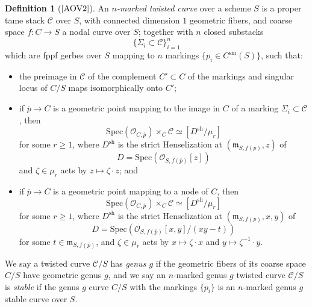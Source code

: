\documentclass[11pt]{amsart}
\theoremstyle{definition}
\newtheorem{definition}[subsection]{Definition}
\begin{document}
\begin{definition}[$\textrm{\cite[\S2]{AOV2}}$]\label{twistedcurvedef}
An \textit{$n$-marked twisted curve} over a scheme $S$ is a proper tame stack ${\mathcal{C}}$ over $S$, with connected dimension $1$ geometric fibers, and coarse space $f:C \rightarrow S$ a nodal curve over $S$; together with $n$ closed substacks 
\begin{displaymath}
\{\Sigma_i \subset {\mathcal{C}}\}_{i = 1}^n 
\end{displaymath}
which are fppf gerbes over $S$ mapping to $n$ markings $\{p_i \in C^{\mathrm{sm}}(S)\}$, such that:
\begin{itemize}
  \item the preimage in ${\mathcal{C}}$ of the complement $C' \subset C$ of the markings and singular locus of $C/S$ maps isomorphically onto $C'$; 
  \item if $\overline{p} \rightarrow C$ is a geometric point mapping to the image in $C$ of a marking $\Sigma_i \subset {\mathcal{C}}$, then 
  \begin{displaymath}
  \mathrm{Spec}({\mathcal{O}}_{C,\overline{p}}) \times_C {\mathcal{C}} \simeq [D^{\mathrm{sh}}/\mu_r]
  \end{displaymath}
  for some $r\geq1$, where $D^{\mathrm{sh}}$ is the strict Henselization at $({\mathfrak{m}}_{S,f(\overline{p})},z)$ of 
  \begin{displaymath}
  D = \mathrm{Spec}({\mathcal{O}}_{S,f(\overline{p})}[z]) 
  \end{displaymath}
  and $\zeta\in \mu_r$ acts by $z\mapsto \zeta\cdot z$; and 
  \item if $\overline{p} \rightarrow C$ is a geometric point mapping to a node of $C$, then
  \begin{displaymath}
  \mathrm{Spec}({\mathcal{O}}_{C,\overline{p}})\times_C {\mathcal{C}} \simeq [D^{\mathrm{sh}}/\mu_r]
  \end{displaymath}
  for some $r\geq 1$, where $D^{\mathrm{sh}}$ is the strict Henselization at $({\mathfrak{m}}_{S,f(\overline{p})},x,y)$ of 
  \begin{displaymath}
  D = \mathrm{Spec}({\mathcal{O}}_{S,f(\overline{p})}[x,y]/(xy-t))
  \end{displaymath}
  for some $t \in {\mathfrak{m}}_{S,f(\overline{p})}$, and $\zeta\in \mu_r$ acts by $x \mapsto \zeta\cdot x$ and $y\mapsto \zeta^{-1}\cdot y$.
\end{itemize}
We say a twisted curve ${\mathcal{C}}/S$ has \textit{genus $g$} if the geometric fibers of its coarse space $C/S$ have geometric genus $g$, and we say an $n$-marked genus $g$ twisted curve ${\mathcal{C}}/S$ is \textit{stable} if the genus $g$ curve $C/S$ with the markings $\{p_i\}$ is an $n$-marked genus $g$ stable curve over $S$.
\end{definition}
\end{document}
